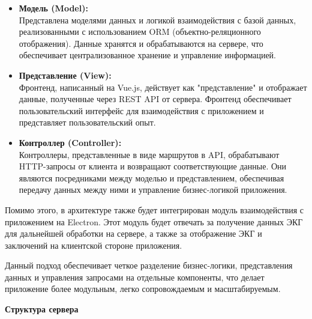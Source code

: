 \documentclass[12pt, russian]{extarticle}
\begin{document}
\begin{spacing}{1.5}
\begin{itemize}
    \item \textbf{Модель (Model):} \\
        Представлена моделями данных и логикой взаимодействия с базой данных, реализованными с использованием ORM (объектно-реляционного отображения). Данные хранятся и обрабатываются на сервере, что обеспечивает централизованное хранение и управление информацией.
    \item \textbf{Представление (View):} \\
        Фронтенд, написанный на Vue.js, действует как "представление" и отображает данные, полученные через REST API от сервера. Фронтенд обеспечивает пользовательский интерфейс для взаимодействия с приложением и представляет пользовательский опыт.
    \item \textbf{Контроллер (Controller):} \\
        Контроллеры, представленные в виде маршрутов в API, обрабатывают HTTP-запросы от клиента и возвращают соответствующие данные. Они являются посредниками между моделью и представлением, обеспечивая передачу данных между ними и управление бизнес-логикой приложения.
\end{itemize}

Помимо этого, в архитектуре также будет интегрирован модуль взаимодействия с приложением на Electron. Этот модуль будет отвечать за получение данных ЭКГ для дальнейшей обработки на сервере, а также за отображение ЭКГ и заключений на клиентской стороне приложения.

Данный подход обеспечивает четкое разделение бизнес-логики, представления данных и управления запросами на отдельные компоненты, что делает приложение более модульным, легко сопровождаемым и масштабируемым.

\par \noindent \textbf{Структура сервера}


\end{spacing}
\end{document}
